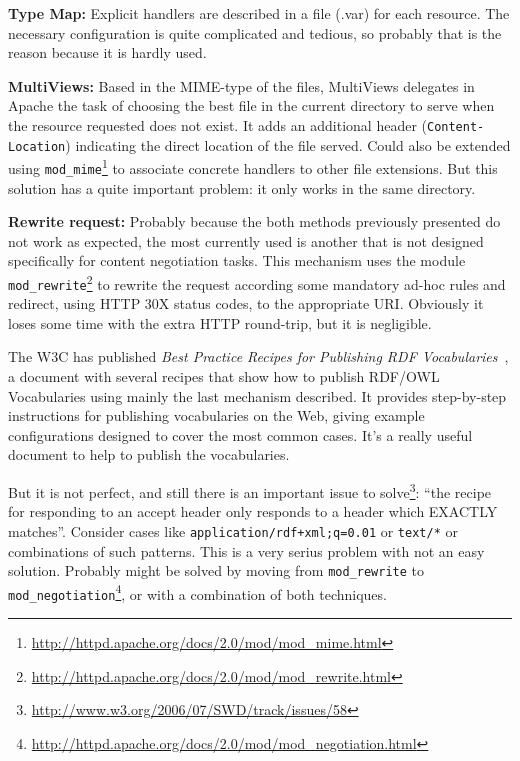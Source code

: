 \documentclass{../templates/llncs}
\begin{document}
\begin{description}

  \item \textbf{Type Map:} Explicit handlers are described in a file (.var) for 
        each resource. The necessary configuration is quite complicated and 
        tedious, so probably that is the reason because it is hardly used.

  \item \textbf{MultiViews:} Based in the MIME-type of the files, MultiViews 
        delegates in Apache the task of choosing the best file in the current 
        directory to serve when the resource requested does not exist. It adds 
        an additional header (\texttt{Content-Location}) indicating the direct 
        location of the file served. Could also be extended using 
        \texttt{mod\_mime}\footnote{\url{http://httpd.apache.org/docs/2.0/mod/mod_mime.html}}
        to associate concrete handlers to other file extensions. But this solution
        has a quite important problem: it only works in the same directory.

  \item \textbf{Rewrite request:} Probably because the both methods previously 
        presented do not work as expected, the most currently used is another 
        that is not designed specifically for content negotiation tasks. This
        mechanism uses the module 
        \texttt{mod\_rewrite}\footnote{\url{http://httpd.apache.org/docs/2.0/mod/mod_rewrite.html}}
        to rewrite the request according some mandatory ad-hoc rules and redirect,
        using HTTP 30X status codes, to the appropriate URI. Obviously it loses 
        some time with the extra HTTP round-trip, but it is negligible.

 \end{description}

The W3C has published \textit{Best Practice Recipes for Publishing RDF Vocabularies}~\cite{Recipes},
a document with several recipes that show how to publish RDF/OWL Vocabularies using
mainly the last mechanism described. It provides step-by-step instructions for publishing 
vocabularies on the Web, giving example configurations designed to cover the most 
common cases. It's a really useful document to help to publish the vocabularies.

But it is not perfect, and still there is an important issue to 
solve\footnote{\url{http://www.w3.org/2006/07/SWD/track/issues/58}}: 
``the recipe for responding to an accept header only responds to a header which
EXACTLY matches''. Consider cases like \texttt{application/rdf+xml;q=0.01} or 
\texttt{text/*} or combinations of such patterns. This is a very serius problem
with not an easy solution. Probably might be solved by moving from \texttt{mod\_rewrite}
to \texttt{mod\_negotiation}\footnote{\url{http://httpd.apache.org/docs/2.0/mod/mod_negotiation.html}},
or with a combination of both techniques.
\end{document}
